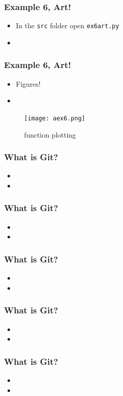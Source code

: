 \documentclass{beamer}
\begin{document}
\begin{frame}
\frametitle{Example 6, Art!}
\begin{itemize}
\item In the \texttt{src} folder open \texttt{ex6art.py} 
\item
\end{itemize}
\end{frame}

\begin{frame}
\frametitle{Example 6, Art!}
\begin{itemize}
\item Figures!
\item
\end{itemize}
\begin{figure}
	\centering
	\texttt{[image: aex6.png]}
	\caption{function plotting}
	\label{fig:function}
\end{figure}
\end{frame}


\begin{frame}
\frametitle{What is Git?}
\begin{itemize}
\item  
\item
\end{itemize}
\end{frame}

\begin{frame}
\frametitle{What is Git?}
\begin{itemize}
\item  
\item
\end{itemize}
\end{frame}

\begin{frame}
\frametitle{What is Git?}
\begin{itemize}
\item  
\item
\end{itemize}
\end{frame}

\begin{frame}
\frametitle{What is Git?}
\begin{itemize}
\item  
\item
\end{itemize}
\end{frame}

\begin{frame}
\frametitle{What is Git?}
\begin{itemize}
\item  
\item
\end{itemize}
\end{frame}
\end{document}
